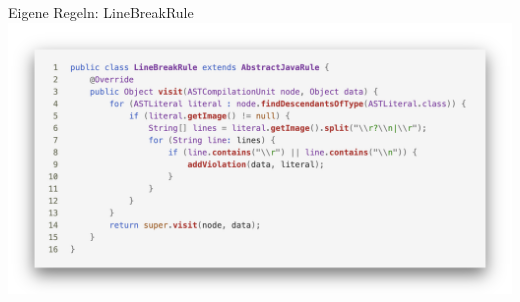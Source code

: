 \documentclass{sdqbeamer}
\begin{document}
\begin{frame}[fragile]{Eigene Regeln: LineBreakRule}
    \vspace{-0.5cm}
    \hspace{-0.7cm}
    \includegraphics[scale=0.23]{logos/CustomRuleLineBreakRule.png}

\end{frame}
\end{document}
